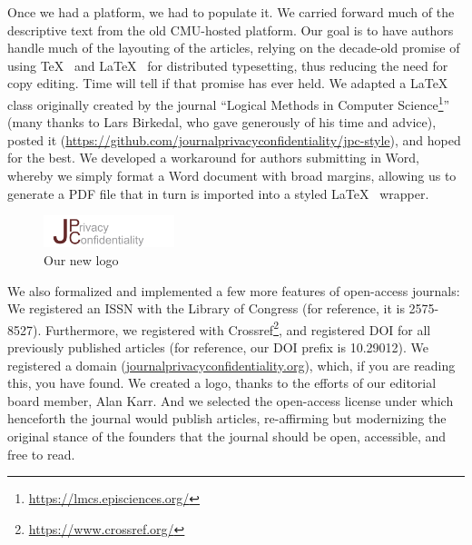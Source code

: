 \documentclass{jpcfinal} %
\newcommand{\urlcite}[2]{#2\footnote{\url{#1}}}
\begin{document}
Once we had a platform, we had to populate it. We carried forward much of the descriptive text from the old CMU-hosted platform. Our goal is to have authors handle much of the layouting of the articles, relying on the decade-old promise of using \TeX~ \citep{Knuth1986} and \LaTeX~ \citep{Lamport1986} for distributed typesetting, thus reducing the need for copy editing. Time will tell if that promise has ever held. We adapted a \LaTeX~ class originally created by the journal ``\urlcite{https://lmcs.episciences.org/}{Logical Methods in Computer Science}'' (many thanks to Lars Birkedal, who gave generously of his time and advice), posted it (\url{https://github.com/journalprivacyconfidentiality/jpc-style}), and hoped for the best. We developed a workaround for authors submitting in Word, whereby we simply format a Word document with broad margins, allowing us to generate a PDF file that in turn is imported into a styled \LaTeX~ wrapper. 

\begin{figure}
	\begin{cornerbox}[width=2in]
		\includegraphics[width=1.5in]{tmpl-images/JPC_4.jpg}
		\caption{Our new logo}
		
	\end{cornerbox}
\end{figure}
We also formalized and implemented a few more features of open-access journals: We registered an \ac{ISSN} with the Library of Congress (for reference, it is 2575-8527). Furthermore, we registered with \urlcite{https://www.crossref.org/}{Crossref}, and registered \ac{DOI} for all previously published articles (for reference, our \ac{DOI} prefix is 10.29012).  We registered a domain (\href{https://www.journalprivacyconfidentiality.org}{journalprivacyconfidentiality.org}), which, if you are reading this, you have found. We created a logo, thanks to the efforts of our editorial board member, Alan Karr. And we selected the open-access license under which henceforth the journal would publish articles, re-affirming but modernizing the original stance of the founders that the journal should be open, accessible, and free to read.
\end{document}
